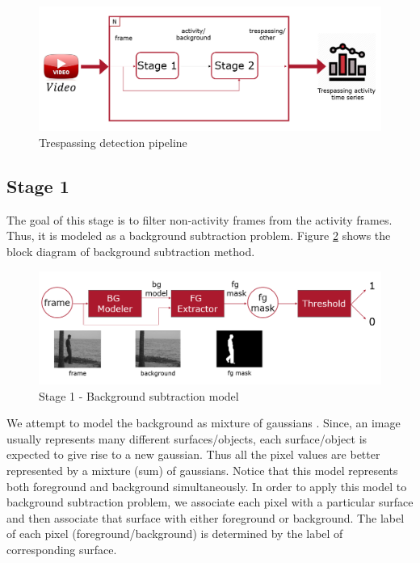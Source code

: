 \begin{figure}
    \centering
    \includegraphics[width=\linewidth]{images/trespassing-detection-pipeline.PNG}
    \caption{Trespassing detection pipeline}
    \label{fig:trespassing-detection-pipeline}
\end{figure}


\subsection{Stage 1}
The goal of this stage is to filter non-activity frames from the activity frames. Thus, it is modeled as a background subtraction problem. Figure \ref{fig:background-subtraction-model} shows the block diagram of background subtraction method. 
\begin{figure}
    \centering
    \includegraphics[width=\linewidth]{images/background-subtraction-model.PNG}
    \caption{Stage 1 - Background subtraction model}
    \label{fig:background-subtraction-model}
\end{figure}

We attempt to model the background as mixture of gaussians \cite{stauffer1999adaptive,power2002understanding}. Since, an image usually represents many different surfaces/objects, each surface/object is expected to give rise to a new gaussian. Thus all the pixel values are better represented by a mixture (sum) of gaussians. Notice that this model represents both foreground and background simultaneously. In order to apply this model to background subtraction problem, we associate each pixel with a particular surface and then associate that surface with either foreground or background. The label of each pixel (foreground/background) is determined by the label of corresponding surface. 

